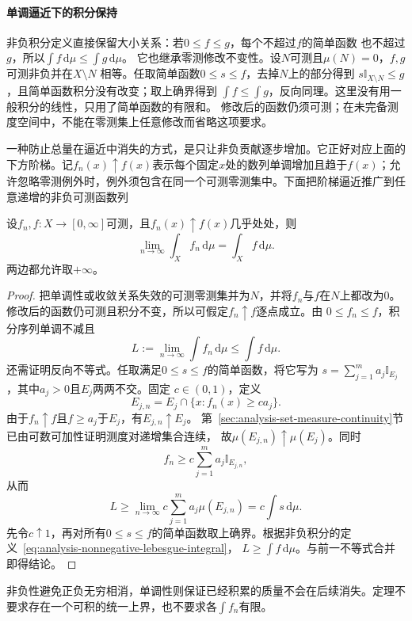 \paragraph{单调逼近下的积分保持}
非负积分定义直接保留大小关系：若$0\leq f\leq g$，每个不超过$f$的简单函数
也不超过$g$，所以$\int f\,\mathrm d\mu\leq\int g\,\mathrm d\mu$。
它也继承零测修改不变性。设$N$可测且$\mu(N)=0$，$f,g$可测非负并在$X\setminus N$
相等。任取简单函数$0\leq s\leq f$，去掉$N$上的部分得到
$s\mathbb I_{X\setminus N}\leq g$，且简单函数积分没有改变；取上确界得到
$\int f\leq\int g$，反向同理。这里没有用一般积分的线性，只用了简单函数的有限和。
修改后的函数仍须可测；在未完备测度空间中，不能在零测集上任意修改而省略这项要求。

一种防止总量在逼近中消失的方式，是只让非负贡献逐步增加。它正好对应上面的下方阶梯。记$f_n(x)\uparrow f(x)$表示每个固定$x$处的数列单调增加且趋于$f(x)$；允许忽略零测例外时，例外须包含在同一个可测零测集中。下面把阶梯逼近推广到任意递增的非负可测函数列
\begin{theorem}[单调收敛定理]
\label{thm:analysis-monotone-convergence}
设$f_n,f:X\to[0,\infty]$可测，且$f_n(x)\uparrow f(x)$几乎处处，则
\[   \lim_{n\to\infty}\int_X f_n\,\mathrm{d}\mu   =   \int_X f\,\mathrm{d}\mu. \]
两边都允许取$+\infty$。
\end{theorem}
\begin{proof}
把单调性或收敛关系失效的可测零测集并为$N$，并将$f_n$与$f$在$N$上都改为$0$。
修改后的函数仍可测且积分不变，所以可假定$f_n\uparrow f$逐点成立。由
$0\leq f_n\leq f$，积分序列单调不减且
\[   L:=\lim_{n\to\infty}\int f_n\,\mathrm{d}\mu   \leq\int f\,\mathrm{d}\mu. \]
还需证明反向不等式。任取满足$0\leq s\leq f$的简单函数，将它写为 $s=\sum_{j=1}^m a_j\mathbb{I}_{E_j}$，其中$a_j>0$且$E_j$两两不交。固定 $c\in(0,1)$，定义
\[   E_{j,n}   =   E_j\cap\{x:f_n(x)\geq ca_j\}. \]
由于$f_n\uparrow f$且$f\geq a_j$于$E_j$，有$E_{j,n}\uparrow E_j$。
第~\ref{sec:analysis-set-measure-continuity}节已由可数可加性证明测度对递增集合连续，
故$\mu(E_{j,n})\uparrow\mu(E_j)$。同时
\[   f_n   \geq   c\sum_{j=1}^m a_j\mathbb{I}_{E_{j,n}}, \]
从而
\[   L   \geq   \lim_{n\to\infty}   c\sum_{j=1}^m a_j\mu(E_{j,n})   =   c\int s\,\mathrm{d}\mu. \]
先令$c\uparrow1$，再对所有$0\leq s\leq f$的简单函数取上确界。根据非负积分的定义~\eqref{eq:analysis-nonnegative-lebesgue-integral}， $L\geq\int f\,\mathrm{d}\mu$。与前一不等式合并即得结论。
\end{proof}

非负性避免正负无穷相消，单调性则保证已经积累的质量不会在后续消失。定理不要求存在一个可积的统一上界，也不要求各$\int f_n$有限。


